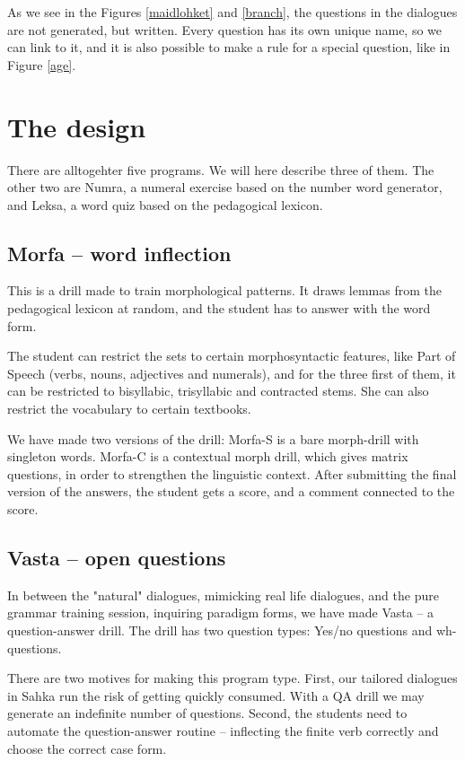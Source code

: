 \documentclass[11pt]{article}
\begin{document}
As we see in the Figures \ref{maidlohket} and \ref{branch}, the questions in the dialogues are not generated, but written. Every question has its own unique name, so we can link to it, and it is also possible to make a rule for a special question, like in Figure \ref{age}.  


\section{The design}
There are alltogehter five programs. We will here describe three of them. The other two are Numra, a numeral exercise based on the number word generator, and Leksa, a word quiz based on the pedagogical lexicon. 

\subsection{Morfa -- word inflection}
This is a drill made to train morphological patterns. It draws lemmas from the pedagogical lexicon at random, and the student has to answer with the word form. 

The student can restrict the sets to certain morphosyntactic features, like Part of Speech (verbs, nouns, adjectives and numerals), and for the three first of them, it can be restricted to bisyllabic, trisyllabic and contracted stems. She can also restrict the vocabulary to certain textbooks.

We have made two versions of the drill: Morfa-S is a bare morph-drill with singleton words. Morfa-C is a contextual morph drill, which gives matrix questions, in order to strengthen the linguistic context. After submitting the final version of the answers, the student gets a score, and a comment connected to the score.


\subsection{Vasta -- open questions}	

In between the "natural" dialogues, mimicking real life dialogues, and the pure grammar training session, inquiring paradigm forms, we have made Vasta -- a question-answer drill. The drill has two question types: Yes/no questions and wh-questions. 

There are two motives for making this program type. First, our tailored dialogues in Sahka run the risk of getting quickly consumed. With a QA drill we may generate an indefinite number of questions. Second, the students need to automate the question-answer routine -- inflecting the finite verb correctly and choose the correct case form.
\end{document}
